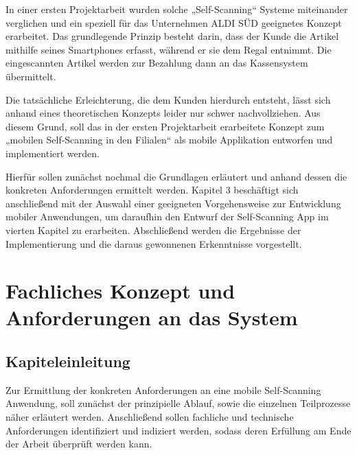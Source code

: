In einer ersten Projektarbeit wurden solche „Self-Scanning“ Systeme miteinander verglichen und ein speziell für das Unternehmen ALDI SÜD geeignetes Konzept erarbeitet. Das grundlegende Prinzip besteht darin, dass der Kunde die Artikel mithilfe seines Smartphones erfasst, während er sie dem Regal entnimmt. Die eingescannten Artikel werden zur Bezahlung dann an das Kassensystem übermittelt.

Die tatsächliche Erleichterung, die dem Kunden hierdurch entsteht, lässt sich anhand eines theoretischen Konzepts leider nur schwer nachvollziehen. Aus diesem Grund, soll das in der ersten Projektarbeit erarbeitete Konzept zum „mobilen Self-Scanning in den Filialen“ als mobile Applikation entworfen und implementiert werden.

Hierfür sollen zunächst nochmal die Grundlagen erläutert und anhand dessen die konkreten Anforderungen ermittelt werden. Kapitel 3 beschäftigt sich anschließend mit der Auswahl einer geeigneten Vorgehensweise zur Entwicklung mobiler Anwendungen, um daraufhin den Entwurf der Self-Scanning App im vierten Kapitel zu erarbeiten. Abschließend werden die Ergebnisse der Implementierung und die daraus gewonnenen Erkenntnisse vorgestellt.


\chapter{Fachliches Konzept und Anforderungen an das System}
\section{Kapiteleinleitung}
Zur Ermittlung der konkreten Anforderungen an eine mobile Self-Scanning Anwendung, soll zunächst der prinzipielle Ablauf, sowie die einzelnen Teilprozesse näher erläutert werden. Anschließend sollen fachliche und technische Anforderungen identifiziert und indiziert werden, sodass deren Erfüllung am Ende der Arbeit überprüft werden kann.

